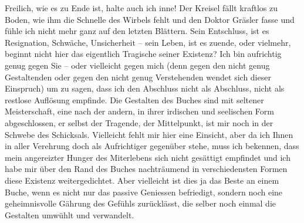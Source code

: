\pstart
           Freilich, wie es zu Ende ist, halte auch ich inne! Der Kreisel fällt kraftlos zu
               Boden, wie ihm die Schnelle des Wirbels fehlt und den Doktor Gräsler fasse und fühle ich nicht mehr ganz auf den
               letzten Blättern. Sein Entschluss, ist es Resignation, Schwäche, Unsicherheit – sein
               Leben, ist es zuende, oder vielmehr, beginnt nicht hier das eigentlich Tragische
               seiner Existenz? Ich bin aufrichtig genug gegen Sie – oder vielleicht gegen mich
               (denn gegen den nicht genug Gestaltenden oder gegen den nicht genug Verstehenden
               wendet sich dieser Einspruch) um zu sagen, dass ich den Abschluss nicht als
               Abschluss, nicht als restlose Auflösung empfinde. Die Gestalten des Buches sind mit
               seltener Meisterschaft, eine nach der andern, in ihrer irdischen und seelischen Form
               abgeschlossen, {\pb}er selbst der Tragende,
               der Mittelpunkt, ist mir noch in der Schwebe des Schicksals. Vielleicht fehlt mir
               hier eine Einsicht, aber da ich Ihnen in aller Verehrung doch als Aufrichtiger
               gegenüber stehe, muss ich bekennen, dass mein angereizter Hunger des Miterlebens sich
               nicht gesättigt empfindet und ich habe mir über den Rand des Buches nachträumend in verschiedensten
               Formen diese Existenz weitergedichtet. Aber vielleicht ist dies ja das Beste an einem
               Buche, wenn es nicht nur das passive Geniessen befriedigt, sondern noch eine
               geheimnisvolle Gährung des Gefühls zurücklässt, die selber noch einmal die Gestalten
               umwühlt und verwandelt.\pend
           
